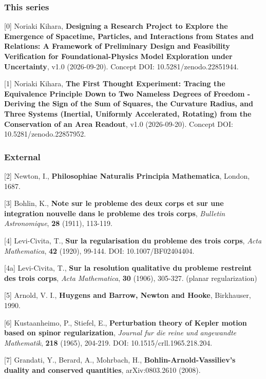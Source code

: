 \documentclass[
  a4paper,
]{article}
\begin{document}
\subsubsection{This series}\label{this-series}

{[}0{]} Noriaki Kihara, \textbf{Designing a Research Project to Explore
the Emergence of Spacetime, Particles, and Interactions from States and
Relations: A Framework of Preliminary Design and Feasibility
Verification for Foundational-Physics Model Exploration under
Uncertainty}, v1.0 (2026-09-20). Concept DOI: 10.5281/zenodo.22851944.

{[}1{]} Noriaki Kihara, \textbf{The First Thought Experiment: Tracing
the Equivalence Principle Down to Two Nameless Degrees of Freedom -
Deriving the Sign of the Sum of Squares, the Curvature Radius, and Three
Systems (Inertial, Uniformly Accelerated, Rotating) from the
Conservation of an Area Readout}, v1.0 (2026-09-20). Concept DOI:
10.5281/zenodo.22857952.

\subsubsection{External}\label{external}

{[}2{]} Newton, I., \textbf{Philosophiae Naturalis Principia
Mathematica}, London, 1687.

{[}3{]} Bohlin, K., \textbf{Note sur le probleme des deux corps et sur
une integration nouvelle dans le probleme des trois corps},
\emph{Bulletin Astronomique}, \textbf{28} (1911), 113-119.

{[}4{]} Levi-Civita, T., \textbf{Sur la regularisation du probleme des
trois corps}, \emph{Acta Mathematica}, \textbf{42} (1920), 99-144. DOI:
10.1007/BF02404404.

{[}4a{]} Levi-Civita, T., \textbf{Sur la resolution qualitative du
probleme restreint des trois corps}, \emph{Acta Mathematica},
\textbf{30} (1906), 305-327. (planar regularization)

{[}5{]} Arnold, V. I., \textbf{Huygens and Barrow, Newton and Hooke},
Birkhauser, 1990.

{[}6{]} Kustaanheimo, P., Stiefel, E., \textbf{Perturbation theory of
Kepler motion based on spinor regularization}, \emph{Journal fur die
reine und angewandte Mathematik}, \textbf{218} (1965), 204-219. DOI:
10.1515/crll.1965.218.204.

{[}7{]} Grandati, Y., Berard, A., Mohrbach, H.,
\textbf{Bohlin-Arnold-Vassiliev's duality and conserved quantities},
arXiv:0803.2610 (2008).
\end{document}
